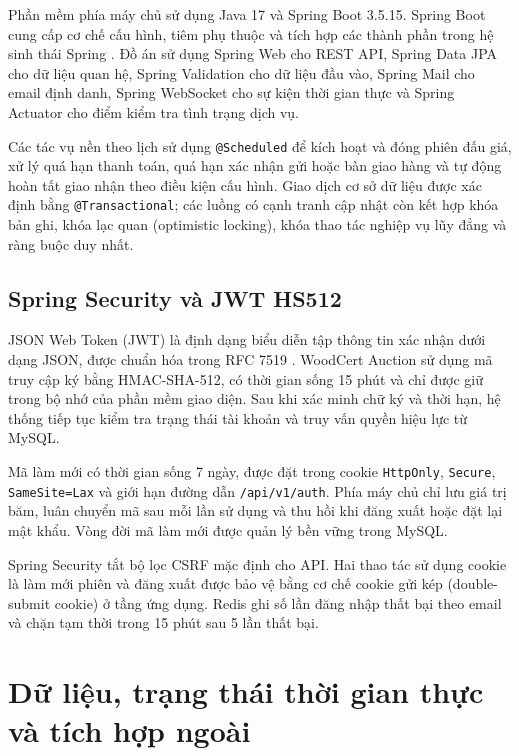 \documentclass[../DoAn.tex]{subfiles}
\begin{document}
Phần mềm phía máy chủ sử dụng Java 17 và Spring Boot 3.5.15. Spring Boot cung cấp cơ chế cấu hình, tiêm phụ thuộc và tích hợp các thành phần trong hệ sinh thái Spring \cite{walls2022spring,springdocs}. Đồ án sử dụng Spring Web cho REST API, Spring Data JPA cho dữ liệu quan hệ, Spring Validation cho dữ liệu đầu vào, Spring Mail cho email định danh, Spring WebSocket cho sự kiện thời gian thực và Spring Actuator cho điểm kiểm tra tình trạng dịch vụ.

Các tác vụ nền theo lịch sử dụng \texttt{@Scheduled} để kích hoạt và đóng phiên đấu giá, xử lý quá hạn thanh toán, quá hạn xác nhận gửi hoặc bàn giao hàng và tự động hoàn tất giao nhận theo điều kiện cấu hình. Giao dịch cơ sở dữ liệu được xác định bằng \texttt{@Transactional}; các luồng có cạnh tranh cập nhật còn kết hợp khóa bản ghi, khóa lạc quan (optimistic locking), khóa thao tác nghiệp vụ lũy đẳng và ràng buộc duy nhất.

\subsection{Spring Security và JWT HS512}

JSON Web Token (JWT) là định dạng biểu diễn tập thông tin xác nhận dưới dạng JSON, được chuẩn hóa trong RFC 7519 \cite{rfc7519}. WoodCert Auction sử dụng mã truy cập ký bằng HMAC-SHA-512, có thời gian sống 15 phút và chỉ được giữ trong bộ nhớ của phần mềm giao diện. Sau khi xác minh chữ ký và thời hạn, hệ thống tiếp tục kiểm tra trạng thái tài khoản và truy vấn quyền hiệu lực từ MySQL.

Mã làm mới có thời gian sống 7 ngày, được đặt trong cookie \texttt{HttpOnly}, \texttt{Secure}, \texttt{SameSite=Lax} và giới hạn đường dẫn \texttt{/api/v1/auth}. Phía máy chủ chỉ lưu giá trị băm, luân chuyển mã sau mỗi lần sử dụng và thu hồi khi đăng xuất hoặc đặt lại mật khẩu. Vòng đời mã làm mới được quản lý bền vững trong MySQL.

Spring Security tắt bộ lọc CSRF mặc định cho API. Hai thao tác sử dụng cookie là làm mới phiên và đăng xuất được bảo vệ bằng cơ chế cookie gửi kép (double-submit cookie) ở tầng ứng dụng. Redis ghi số lần đăng nhập thất bại theo email và chặn tạm thời trong 15 phút sau 5 lần thất bại.

\section{Dữ liệu, trạng thái thời gian thực và tích hợp ngoài}
\end{document}
